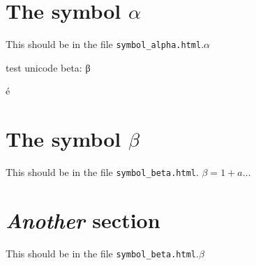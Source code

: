 \documentclass{article}
\begin{document}
\tableofcontents
\section{The symbol $\alpha$}

This should be in the file \texttt{symbol\_alpha.html}.$\alpha$

test unicode beta: β

\'e

\section{The symbol $\beta$}

This should be in the file \texttt{symbol\_beta.html}. $\beta = 1 + a \ldots$

\section{\textit{Another} section}

This should be in the file \texttt{symbol\_beta.html}.$\beta$
\end{document}
